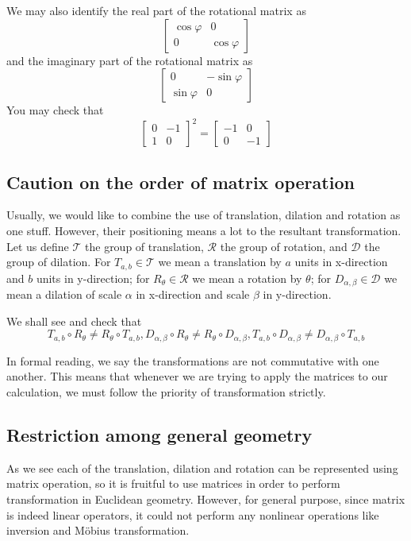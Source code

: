 \documentclass[12pt]{article}
\begin{document}
    We may also identify the real part of the rotational matrix as $$\begin{bmatrix}
        \cos{\varphi}&0\\0&\cos{\varphi}
    \end{bmatrix}$$ 
    and the imaginary part of the rotational matrix as $$\begin{bmatrix}
        0&-\sin{\varphi}\\ \sin{\varphi}&0
    \end{bmatrix}$$ 
    You may check that $$\begin{bmatrix}
        0&-1\\1&0
    \end{bmatrix}^2=\begin{bmatrix}
        -1&0\\0&-1
    \end{bmatrix}$$

    \subsection*{Caution on the order of matrix operation}

    Usually, we would like to combine the use of translation, dilation and rotation as one stuff. However, their positioning means a lot to the resultant transformation. Let us define $\mathcal{T}$ the group of translation, $\mathcal{R}$ the group of rotation, and $\mathcal{D}$ the group of dilation. For $T_{a,b}\in\mathcal{T}$ we mean a translation by $a$ units in x-direction and $b$ units in y-direction; for $R_\theta\in\mathcal{R}$ we mean a rotation by $\theta$; for $D_{\alpha,\beta}\in\mathcal{D}$ we mean a dilation of scale $\alpha$ in x-direction and scale $\beta$ in y-direction. 

    We shall see and check that $$T_{a,b}\circ R_\theta \neq R_\theta\circ T_{a,b}, D_{\alpha,\beta}\circ R_\theta \neq R_\theta\circ D_{\alpha,\beta}, T_{a,b}\circ D_{\alpha,\beta} \neq D_{\alpha,\beta}\circ T_{a,b}$$

    In formal reading, we say the transformations are not commutative with one another. This means that whenever we are trying to apply the matrices to our calculation, we must follow the priority of transformation strictly.

    \subsection*{Restriction among general geometry}
    As we see each of the translation, dilation and rotation can be represented using matrix operation, so it is fruitful to use matrices in order to perform transformation in Euclidean geometry. However, for general purpose, since matrix is indeed linear operators, it could not perform any nonlinear operations like inversion and Möbius transformation.
\end{document}
